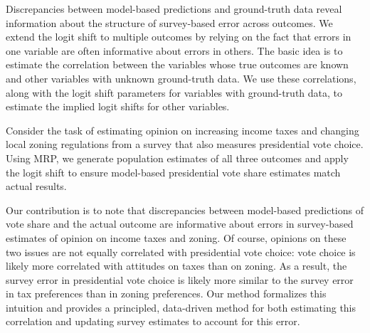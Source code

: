 


Discrepancies between model-based predictions and ground-truth data reveal information about the structure of survey-based error across outcomes.
We extend the logit shift to multiple outcomes by relying on the fact that errors in one variable are often informative about errors in others.
The basic idea is to estimate the correlation between the variables whose true outcomes are known and other variables with unknown ground-truth data.
We use these correlations, along with the logit shift parameters for variables with ground-truth data, to estimate the implied logit shifts for other variables. 

Consider the task of estimating opinion on increasing income taxes and changing local zoning regulations from a survey that also measures presidential vote choice.
Using MRP, we generate population estimates of all three outcomes and apply the logit shift to ensure model-based presidential vote share estimates match actual results.

Our contribution is to note that discrepancies between model-based predictions of vote share and the actual outcome are informative about errors in survey-based estimates of opinion on income taxes and zoning.
Of course, opinions on these two issues are not equally correlated with presidential vote choice: vote choice is likely more correlated with attitudes on taxes than on zoning.
As a result, the survey error in presidential vote choice is likely more similar to the survey error in tax preferences than in zoning preferences.
Our method formalizes this intuition and provides a principled, data-driven method for both estimating this correlation and updating survey estimates to account for this error.

